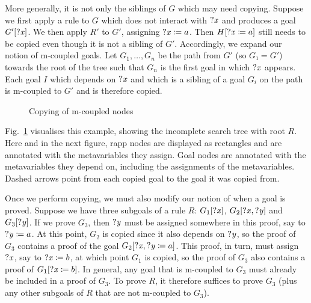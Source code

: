 More generally, it is not only the siblings of $G$ which may need copying.
Suppose we first apply a rule to $G$ which does not interact with $\mathit{?x}$ and produces a goal $G'[\mathit{?x}]$.
We then apply $R'$ to $G'$, assigning $\mathit{?x} \coloneqq a$.
Then $H[\mathit{?x} \coloneqq a]$ still needs to be copied even though it is not a sibling of $G'$.
Accordingly, we expand our notion of m-coupled goals.
Let $G_{1}, \dots, G_{n}$ be the path from $G'$ (so $G₁ = G'$) towards the root of the tree such that $G_{n}$ is the first goal in which $\mathit{?x}$ appears.
Each goal $I$ which depends on $\mathit{?x}$ and which is a sibling of a goal $G_{i}$ on the path is m-coupled to $G'$ and is therefore copied.

\begin{figure}
  \caption{Copying of m-coupled nodes}%
  \label{fig:mvars-path}
\end{figure}

Fig.~\ref{fig:mvars-path} visualises this example, showing the incomplete search tree with root $R$.
Here and in the next figure, rapp nodes are displayed as rectangles and are annotated with the metavariables they assign.
Goal nodes are annotated with the metavariables they depend on, including the assignments of the metavariables.
Dashed arrows point from each copied goal to the goal it was copied from.

Once we perform copying, we must also modify our notion of when a goal is proved.
Suppose we have three subgoals of a rule $R$: $G_{1}[\mathit{?x}]$, $G_{2}[\mathit{?x}, \mathit{?y}]$ and $G_{3}[\mathit{?y}]$.
If we prove $G_{3}$, then $\mathit{?y}$ must be assigned somewhere in this proof, say to $\mathit{?y} \coloneqq a$.
At this point, $G_{2}$ is copied since it also depends on $\mathit{?y}$, so the proof of $G_{3}$ contains a proof of the goal $G_{2}[\mathit{?x}, \mathit{?y} \coloneqq a]$.
This proof, in turn, must assign $\mathit{?x}$, say to $\mathit{?x} \coloneqq b$, at which point $G_{1}$ is copied, so the proof of $G_{3}$ also contains a proof of $G_{1}[\mathit{?x} \coloneqq b]$.
In general, any goal that is m-coupled to $G_{3}$ must already be included in a proof of $G_{3}$.
To prove $R$, it therefore suffices to prove $G_{3}$ (plus any other subgoals of $R$ that are not m-coupled to $G_{3}$).

